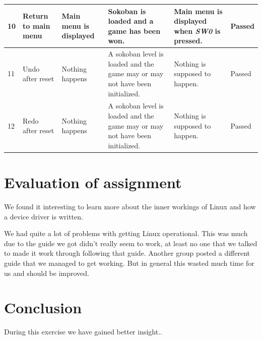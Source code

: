 \documentclass[a4paper,11pt]{article}
\begin{document}
\begin{center}
\begin{tabular}[pos]{|m{35pt}|m{45pt}|m{80pt}|m{90pt}|m{105pt}|m{40pt}|}
\hline 10 & Return to main menu & Main menu is displayed & Sokoban is loaded and a game has been won. & Main menu is displayed when \emph{SW0} is pressed.  & Passed \\

\hline 11 & Undo after reset & Nothing happens & A sokoban level is loaded and the game may or may not have been initialized. & Nothing is supposed to happen.  & Passed \\

\hline 12 & Redo after reset & Nothing happens & A sokoban level is loaded and the game may or may not have been initialized. & Nothing is supposed to happen.  & Passed \\

\hline 
\end{tabular} 
\end{center}

\newpage

\section{Evaluation of assignment}
We found it interesting to learn more about the inner workings of Linux and how a device driver is written. 

We had quite a lot of problems with getting Linux operational. This was much due to the guide we got didn't really seem to work, at least no one that we talked to made it work through following that guide. Another group posted a different guide that we managed to get working. But in general this wasted much time for us and should be improved. 

\section{Conclusion}
During this exercise we have gained better insight..
\end{document}
